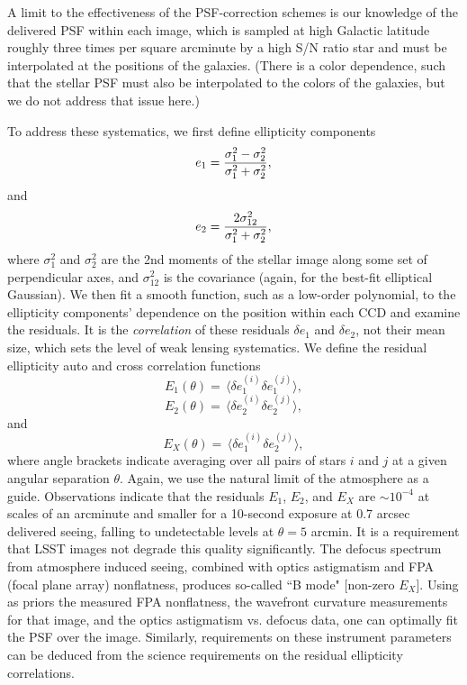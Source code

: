 A limit to the effectiveness of the PSF-correction schemes is our
knowledge of the delivered PSF within each image, which is sampled
at high Galactic latitude roughly three times per square arcminute by a
high S/N ratio star and must be interpolated at the positions of the
galaxies. (There is a color dependence, such that the stellar PSF must
also be interpolated to the colors of the galaxies, but we do not
address that issue here.)

To address these systematics, we first define ellipticity components
\begin{equation}
 e_1 = {\sigma_1^2 - \sigma_2^2 \over \sigma_1^2 + \sigma_2^2},
\end{equation}
and
\begin{equation}
 e_2 = {2 \sigma_{12}^2 \over \sigma_1^2 + \sigma_2^2},
\end{equation}
where $\sigma_1^2$ and $\sigma_2^2$ are the 2nd moments of the stellar
image along some set of perpendicular axes, and $\sigma_{12}^2$ is the
covariance (again, for the best-fit elliptical Gaussian).  We then fit
a smooth function, such as a low-order polynomial, to the ellipticity
components' dependence on the position within each CCD and examine the
residuals.  It is the {\it correlation} of these residuals $\delta e_1$
and $\delta e_2$, not their
mean size, which sets the level of weak lensing systematics.  We
define the residual ellipticity auto and cross correlation functions
\begin{equation}
 E_1(\theta) = \, \langle \delta e_1^{(i)}\delta e_1^{(j)} \rangle,
\end{equation}
\begin{equation}
 E_2(\theta) = \, \langle \delta e_2^{(i)}\delta e_2^{(j)} \rangle,
\end{equation}
and
\begin{equation}
 E_X(\theta) = \, \langle \delta e_1^{(i)}\delta e_2^{(j)} \rangle,
\end{equation}
where angle brackets indicate averaging over all pairs of stars $i$ and
$j$ at a given angular separation $\theta$.  Again, we use the natural
limit of the atmosphere as a guide.  Observations indicate that the residuals $E_1$,
$E_2$, and $E_X$ are $\sim 10^{-4}$ at scales of an arcminute and smaller for
a 10-second exposure at 0.7 arcsec delivered seeing, falling to undetectable
levels at $\theta = 5$ arcmin.  It is a requirement that LSST images not degrade
this quality significantly. The defocus spectrum from atmosphere induced seeing,
combined with optics astigmatism and FPA (focal plane array) nonflatness, produces
so-called ``B mode" [non-zero $E_X$]. Using as priors the measured FPA nonflatness, the wavefront
curvature measurements for that image, and the optics astigmatism vs. defocus
data,
one can optimally fit the PSF over the image. Similarly, requirements on these
instrument parameters can be deduced from the science requirements on the
residual ellipticity correlations.


